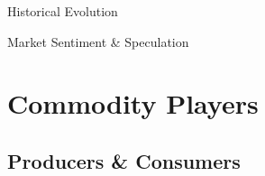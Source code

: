 \documentclass[10pt]{article}
\begin{document}
    \begin{core}{Historical Evolution}


    \end{core}

    \begin{core}{Market Sentiment \& Speculation}


    \end{core}

\section{Commodity Players}

  \subsection{Producers \& Consumers}
    
\end{document}
